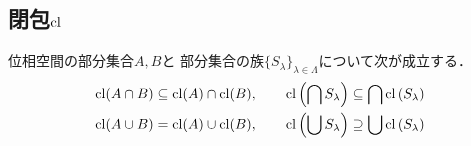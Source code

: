 \documentclass[a4paper]{jarticle}
\begin{document}
    \subsection{閉包$\operatorname{cl}$}
    位相空間の部分集合$A, B$と
    部分集合の族$\{S_{\lambda}\}_{\lambda \in \Lambda}$について次が成立する．
    \begin{gather}
        \operatorname{cl}(A \cap B) \subseteq \operatorname{cl}(A) \cap \operatorname{cl}(B), \qquad
        \operatorname{cl} \left(\bigcap S_{\lambda}\right) \subseteq \bigcap \operatorname{cl} \left( S_{\lambda} \right) \\
        \operatorname{cl}(A \cup B) = \operatorname{cl}(A) \cup \operatorname{cl}(B), \qquad
        \operatorname{cl} \left( \bigcup S_{\lambda} \right) \supseteq \bigcup \operatorname{cl} \left( S_{\lambda} \right)
    \end{gather}
\end{document}
